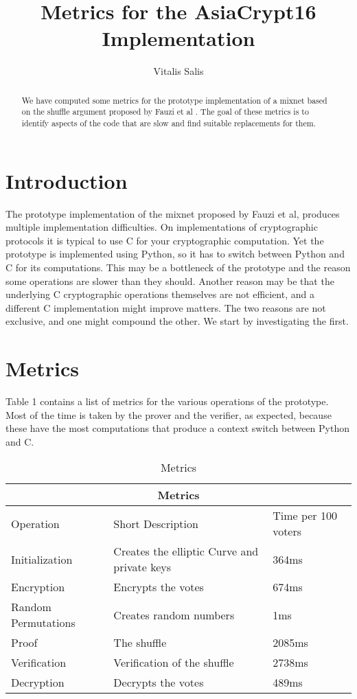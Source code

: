 \documentclass{article}
\date{}
\begin{document}
\title{Metrics for the AsiaCrypt16 Implementation} 

\author{Vitalis Salis}

\maketitle
\begin{abstract}
  We have computed some metrics for the prototype implementation
  \cite{prototype} of a mixnet based on the shuffle argument proposed
  by Fauzi et al \cite{shufflearg}. The goal of these metrics is to
  identify aspects of the code that are slow and find suitable
  replacements for them.
\end{abstract}

\section{Introduction}

The prototype implementation of the mixnet proposed by Fauzi et al,
produces multiple implementation difficulties. On implementations of
cryptographic protocols it is typical to use C for your cryptographic
computation. Yet the prototype is implemented using Python, so it has
to switch between Python and C for its computations. This may be a
bottleneck of the prototype and the reason some operations are slower
than they should. Another reason may be that the underlying C
cryptographic operations themselves are not efficient, and a different
C implementation might improve matters. The two reasons are not
exclusive, and one might compound the other. We start by investigating
the first. 

\section{Metrics}

Table 1 contains a list of metrics for the various operations of the
prototype. Most of the time is taken by the prover and the verifier,
as expected, because these have the most computations that produce a
context switch between Python and C.

\begin{table}
\begin{tabular}{ |p{3cm}|p{5cm}|p{3cm}|  }
    \hline
    \multicolumn{3}{|c|}{Metrics}\\
    \hline
    Operation & Short Description & Time per 100 voters\\
    \hline
    Initialization & Creates the elliptic Curve and private keys & 364ms\\
    Encryption & Encrypts the votes & 674ms\\
    Random Permutations & Creates random numbers & 1ms\\
    Proof & The shuffle & 2085ms\\
    Verification & Verification of the shuffle & 2738ms\\
    Decryption & Decrypts the votes & 489ms\\
    \hline
\end{tabular}
\caption{Metrics}
\end{table}
\end{document}
